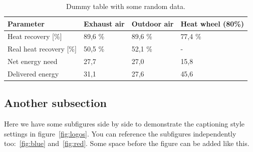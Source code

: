 \documentclass[12pt, a4paper, oneside]{article}
\begin{document}
\blindtext[2]

\begin{table}[t]
    \centering
    \caption[Dummy table]{Dummy table with some random data.}
    \begin{tabularx}{\textwidth}{Xlll}
        \toprule
        \textbf{Parameter}      & \textbf{Exhaust air} & \textbf{Outdoor air} & \textbf{Heat wheel (80\%)} \\
        \midrule
        Heat recovery [\%]      & 89,6 \%              & 89,6 \%              & 77,4 \%                    \\
        Real heat recovery [\%] & 50,5 \%              & 52,1 \%              & -                          \\
        Net energy need         & 27,7                 & 27,0                 & 15,8                       \\
        Delivered energy        & 31,1                 & 27,6                 & 45,6                       \\
        \bottomrule
    \end{tabularx}
    \label{tab:example}
\end{table}

\subsection{Another subsection} \label{subsec:another-subsection}

Here we have some subfigures side by side to demonstrate the captioning style settings in figure~\ref{fig:logos}.
You can reference the subfigures independently too:~\ref{fig:blue} and~\ref{fig:red}.
Some space before the figure can be added like this. \medskip
\end{document}
